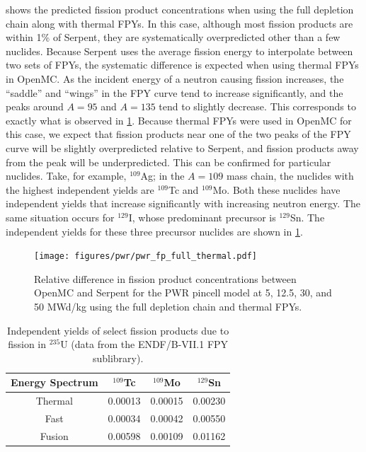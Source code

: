 \documentclass[3p,authoryear]{elsarticle}
\begin{document}
 shows the predicted fission product concentrations
when using the full depletion chain along with thermal FPYs. In this case,
although most fission products are within 1\% of Serpent, they are
systematically overpredicted other than a few nuclides. Because Serpent uses the
average fission energy to interpolate between two sets of FPYs, the systematic
difference is expected when using thermal FPYs in OpenMC. As the incident energy
of a neutron causing fission increases, the ``saddle'' and ``wings'' in the FPY
curve tend to increase significantly, and the peaks around $A=95$ and $A=135$
tend to slightly decrease. This corresponds to exactly what is observed in
\cref{fig:pwr-fp-full-thermal}. Because thermal FPYs were used in OpenMC for
this case, we expect that fission products near one of the two peaks of the FPY
curve will be slightly overpredicted relative to Serpent, and fission products
away from the peak will be underpredicted. This can be confirmed for particular
nuclides. Take, for example, $^{109}$Ag; in the $A=109$ mass chain, the nuclides
with the highest independent yields are $^{109}$Tc and $^{109}$Mo. Both these
nuclides have independent yields that increase significantly with increasing
neutron energy. The same situation occurs for $^{129}$I, whose predominant
precursor is $^{129}$Sn. The independent yields for these three precursor
nuclides are shown in \cref{tab:fp-yields}.
\begin{figure}[H]
  \centering
  \texttt{[image: figures/pwr/pwr\_fp\_full\_thermal.pdf]}
  \caption{Relative difference in fission product concentrations between OpenMC
  and Serpent for the PWR pincell model at 5, 12.5, 30, and 50 MWd/kg using the
  full depletion chain and thermal FPYs.}
  \label{fig:pwr-fp-full-thermal}
\end{figure}
\begin{table}[htbp]
  \centering
  \caption{Independent yields of select fission products due to fission in
  $^{235}$U (data from the ENDF/B-VII.1 FPY sublibrary).}
  \label{tab:fp-yields}
  \begin{tabular}{cccc}
    \toprule
    \textbf{Energy Spectrum} & \textbf{$^{109}$Tc} & \textbf{$^{109}$Mo} & \textbf{$^{129}$Sn} \\
    \midrule
    Thermal & 0.00013 & 0.00015 & 0.00230 \\
    Fast & 0.00034 & 0.00042 & 0.00550 \\
    Fusion & 0.00598 & 0.00109 & 0.01162 \\
    \bottomrule
  \end{tabular}
\end{table}
\end{document}

